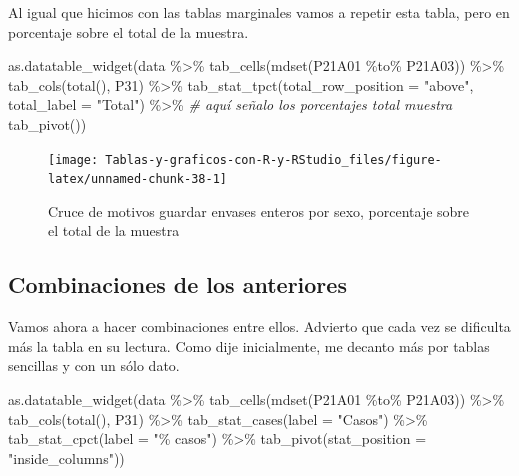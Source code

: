 \documentclass[
]{book}
\newenvironment{Shaded}{\begin{snugshade}}{\end{snugshade}}
\newcommand{\AttributeTok}[1]{\textcolor[rgb]{0.77,0.63,0.00}{#1}}
\newcommand{\CommentTok}[1]{\textcolor[rgb]{0.56,0.35,0.01}{\textit{#1}}}
\newcommand{\FunctionTok}[1]{\textcolor[rgb]{0.00,0.00,0.00}{#1}}
\newcommand{\NormalTok}[1]{#1}
\newcommand{\SpecialCharTok}[1]{\textcolor[rgb]{0.00,0.00,0.00}{#1}}
\newcommand{\StringTok}[1]{\textcolor[rgb]{0.31,0.60,0.02}{#1}}
\begin{document}
Al igual que hicimos con las tablas marginales vamos a repetir esta tabla, pero en porcentaje sobre el total de la muestra.

\begin{Shaded}
\begin{Highlighting}[]
\FunctionTok{as.datatable\_widget}\NormalTok{(data }\SpecialCharTok{\%\textgreater{}\%}
    \FunctionTok{tab\_cells}\NormalTok{(}\FunctionTok{mdset}\NormalTok{(P21A01 }\SpecialCharTok{\%to\%}\NormalTok{ P21A03)) }\SpecialCharTok{\%\textgreater{}\%}
    \FunctionTok{tab\_cols}\NormalTok{(}\FunctionTok{total}\NormalTok{(), P31) }\SpecialCharTok{\%\textgreater{}\%}
    \FunctionTok{tab\_stat\_tpct}\NormalTok{(}\AttributeTok{total\_row\_position =} \StringTok{"above"}\NormalTok{, }\AttributeTok{total\_label =} \StringTok{"Total"}\NormalTok{) }\SpecialCharTok{\%\textgreater{}\%} \CommentTok{\# aquí señalo los porcentajes total muestra}
    \FunctionTok{tab\_pivot}\NormalTok{())}
\end{Highlighting}
\end{Shaded}

\begin{figure}[H]

{\centering \texttt{[image: Tablas-y-graficos-con-R-y-RStudio\_files/figure-latex/unnamed-chunk-38-1]} 

}

\caption{Cruce de motivos guardar envases enteros por sexo, porcentaje sobre el total de la muestra}\label{fig:unnamed-chunk-38}
\end{figure}

\hypertarget{combinaciones-de-los-anteriores-1}{%
\subsection{Combinaciones de los anteriores}\label{combinaciones-de-los-anteriores-1}}

Vamos ahora a hacer combinaciones entre ellos. Advierto que cada vez se dificulta más la tabla en su lectura. Como dije inicialmente, me decanto más por tablas sencillas y con un sólo dato.

\begin{Shaded}
\begin{Highlighting}[]
\FunctionTok{as.datatable\_widget}\NormalTok{(data }\SpecialCharTok{\%\textgreater{}\%}
  \FunctionTok{tab\_cells}\NormalTok{(}\FunctionTok{mdset}\NormalTok{(P21A01 }\SpecialCharTok{\%to\%}\NormalTok{ P21A03)) }\SpecialCharTok{\%\textgreater{}\%}
  \FunctionTok{tab\_cols}\NormalTok{(}\FunctionTok{total}\NormalTok{(), P31) }\SpecialCharTok{\%\textgreater{}\%}
  \FunctionTok{tab\_stat\_cases}\NormalTok{(}\AttributeTok{label =} \StringTok{"Casos"}\NormalTok{) }\SpecialCharTok{\%\textgreater{}\%}
  \FunctionTok{tab\_stat\_cpct}\NormalTok{(}\AttributeTok{label =} \StringTok{"\% casos"}\NormalTok{) }\SpecialCharTok{\%\textgreater{}\%}
  \FunctionTok{tab\_pivot}\NormalTok{(}\AttributeTok{stat\_position =} \StringTok{"inside\_columns"}\NormalTok{))}
\end{Highlighting}
\end{Shaded}
\end{document}
